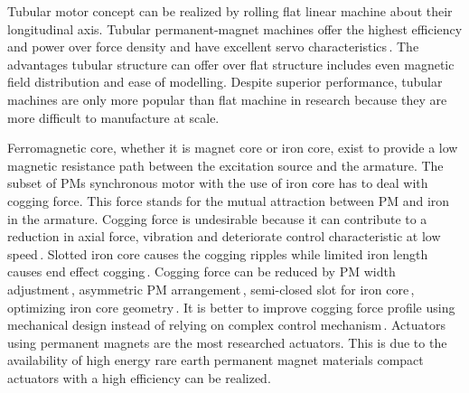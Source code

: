         
        Tubular motor concept can be realized by rolling flat linear machine about their longitudinal axis. Tubular permanent-magnet machines offer the highest efficiency and power over force density and have excellent servo characteristics\,\cite{Eastham1990NovelDisc}. The advantages tubular structure can offer over flat structure includes even magnetic field distribution and ease of modelling. Despite superior performance, tubular machines are only more popular than flat machine in research because they are more difficult to manufacture at scale.
        
        
        Ferromagnetic core, whether it is magnet core or iron core, exist to provide a low magnetic resistance path between the excitation source and the armature. The subset of \acp{PM} synchronous motor with the use of iron core has to deal with cogging force. This force stands for the mutual attraction between PM and iron in the armature. Cogging force is undesirable because it can contribute to a reduction in axial force, vibration and deteriorate control characteristic at low speed\,\cite{Jung1999}. Slotted iron core causes the cogging ripples while limited iron length causes end effect cogging\,\cite{Lim2002}. Cogging force can be reduced by PM width adjustment\,\cite{Bianchi2002DesignMotors}, asymmetric PM arrangement\,\cite{Chung2016,Bianchi2003a,Cai2012}, semi-closed slot for iron core\,\cite{Zhu1997,Bai2015ReducingStructure,Zhu2008}, optimizing iron core geometry\,\cite{Inoue2000,Zhu1997,Wu2008,Zhu2009conf,Zhang2013,Kim2016,Lee2014}. It is better to improve cogging force profile using mechanical design instead of relying on complex control mechanism\,\cite{Jahn1996}. Actuators using permanent magnets are the most researched actuators. This is due to the availability of high energy rare earth permanent magnet materials compact actuators with a high efficiency can be realized.
        
